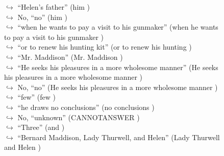 \documentclass[11pt,a4paper, onecolumn]{article}
\begin{document}
\begin{figure}[t] \small \begin{tcolorbox}[boxsep=0pt,left=5pt,right=0pt,top=2pt,colback = yellow!5] \begin{dialogue}
 \small 
\colorbox{pink!25}{$\hookrightarrow$}
{ ``Helen's father'' (him ) }
\\
\colorbox{pink!25}{$\hookrightarrow$}
\colorbox{red!25}{No,}
{ ``no'' (him ) }
\\
\colorbox{pink!25}{$\hookrightarrow$}
{ ``when he wants to pay a visit to his gunmaker'' (when he wants to pay a visit to his gunmaker ) }
\\
\colorbox{pink!25}{$\hookrightarrow$}
{ ``or to renew his hunting kit'' (or to renew his hunting ) }
\\
\colorbox{pink!25}{$\hookrightarrow$}
{ ``Mr. Maddison'' (Mr. Maddison ) }
\\
\colorbox{pink!25}{$\hookrightarrow$}
{ ``He seeks his pleasures in a more wholesome manner'' (He seeks his pleasures in a more wholesome manner ) }
\\
\colorbox{pink!25}{$\hookrightarrow$}
\colorbox{red!25}{No,}
{ ``no'' (He seeks his pleasures in a more wholesome manner ) }
\\
\colorbox{pink!25}{$\hookrightarrow$}
{ ``few'' (few ) }
\\
\colorbox{pink!25}{$\hookrightarrow$}
{ ``he draws no conclusions'' (no conclusions ) }
\\
\colorbox{pink!25}{$\hookrightarrow$}
\colorbox{red!25}{No,}
{ ``unknown'' (CANNOTANSWER ) }
\\
\colorbox{pink!25}{$\hookrightarrow$}
{ ``Three'' (and ) }
\\
\colorbox{pink!25}{$\hookrightarrow$}
{ ``Bernard Maddison, Lady Thurwell, and Helen'' (Lady Thurwell and Helen ) }

\end{dialogue}
\end{tcolorbox}
\end{figure}
\end{document}
